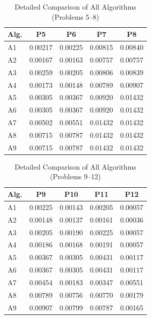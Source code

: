 \documentclass[reprint, amsmath, amssymb, aps, prl]{revtex4-2}
\begin{document}
\begin{table}[H]
\centering
\caption{Detailed Comparison of All Algorithms (Problems 5--8)}
\label{tab:detailed_comparison_2}
\begin{tabular}{lcccc}
\toprule
Alg. & P5 & P6 & P7 & P8 \\
\midrule
A1 & 0.00217 & 0.00225 & 0.00815 & 0.00840 \\
A2 & 0.00167 & 0.00163 & 0.00757 & 0.00757 \\
A3 & 0.00259 & 0.00205 & 0.00806 & 0.00839 \\
A4 & 0.00173 & 0.00148 & 0.00789 & 0.00907 \\
A5 & 0.00305 & 0.00367 & 0.00920 & 0.01432 \\
A6 & 0.00305 & 0.00367 & 0.00920 & 0.01432 \\
A7 & 0.00502 & 0.00551 & 0.01432 & 0.01432 \\
A8 & 0.00715 & 0.00787 & 0.01432 & 0.01432 \\
A9 & 0.00715 & 0.00787 & 0.01432 & 0.01432 \\
\bottomrule
\end{tabular}
\end{table}

\begin{table}[H]
\centering
\caption{Detailed Comparison of All Algorithms (Problems 9--12)}
\label{tab:detailed_comparison_3}
\begin{tabular}{lcccc}
\toprule
Alg. & P9 & P10 & P11 & P12 \\
\midrule
A1 & 0.00225 & 0.00143 & 0.00205 & 0.00057 \\
A2 & 0.00148 & 0.00137 & 0.00161 & 0.00036 \\
A3 & 0.00205 & 0.00190 & 0.00225 & 0.00057 \\
A4 & 0.00186 & 0.00168 & 0.00191 & 0.00057 \\
A5 & 0.00367 & 0.00305 & 0.00431 & 0.00117 \\
A6 & 0.00367 & 0.00305 & 0.00431 & 0.00117 \\
A7 & 0.00454 & 0.00183 & 0.00347 & 0.00551 \\
A8 & 0.00789 & 0.00756 & 0.00770 & 0.00179 \\
A9 & 0.00907 & 0.00799 & 0.00787 & 0.00165 \\
\bottomrule
\end{tabular}
\end{table}
\end{document}
